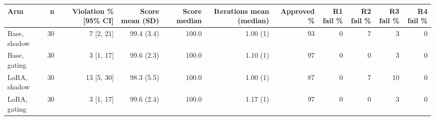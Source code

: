 \begin{tabular}{lrrrrrrrrrr}
\toprule
Arm & n & Violation \% {[}95\% CI{]} & Score mean (SD) & Score median & Iterations mean (median) & Approved \% & R1 fail \% & R2 fail \% & R3 fail \% & R4 fail \% \\
\midrule
Base, shadow & 30 & 7 {[}2, 21{]} & 99.4 (3.4) & 100.0 & 1.00 (1) & 93 & 0 & 7 & 3 & 0 \\
Base, gating & 30 & 3 {[}1, 17{]} & 99.6 (2.3) & 100.0 & 1.10 (1) & 97 & 0 & 0 & 3 & 0 \\
LoRA, shadow & 30 & 13 {[}5, 30{]} & 98.3 (5.5) & 100.0 & 1.00 (1) & 87 & 0 & 7 & 10 & 0 \\
LoRA, gating & 30 & 3 {[}1, 17{]} & 99.6 (2.4) & 100.0 & 1.17 (1) & 97 & 0 & 0 & 3 & 0 \\
\bottomrule
\end{tabular}
